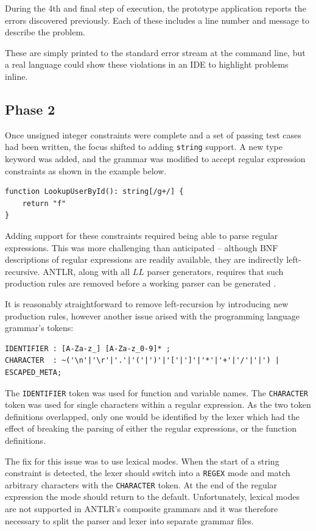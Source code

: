 \documentclass[a4paper]{article}
\begin{document}
    During the 4th and final step of execution, the prototype application reports the errors discovered previously. Each of these includes a line number and message to describe the problem.
    
    These are simply printed to the standard error stream at the command line, but a real language could show these violations in an IDE to highlight problems inline.

\subsection*{Phase 2}\hfill

Once unsigned integer constraints were complete and a set of passing test cases had been written, the focus shifted to adding \texttt{string} support. A new type keyword was added, and the grammar was modified to accept regular expression constraints as shown in the example below.

\begin{verbatim}
function LookupUserById(): string[/g+/] {
    return "f"
}
\end{verbatim}

Adding support for these constraints required being able to parse regular expressions. This was more challenging than anticipated -- although BNF descriptions of regular expressions are readily available, they are indirectly left-recursive. ANTLR, along with all $LL$ parser generators, requires that such production rules are removed before a working parser can be generated \citep{dick1990parsing}.

It is reasonably straightforward to remove left-recursion by introducing new production rules, however another issue arised with the programming language grammar's tokens:

\begin{verbatim}
IDENTIFIER : [A-Za-z_] [A-Za-z_0-9]* ;
CHARACTER  : ~('\n'|'\r'|'.'|'('|')'|'['|']'|'*'|'+'|'/'|'|') | ESCAPED_META;
\end{verbatim}

The \texttt{IDENTIFIER} token was used for function and variable names. The \texttt{CHARACTER} token was used for single characters within a regular expression. As the two token definitions overlapped, only one would be identified by the lexer which had the effect of breaking the parsing of either the regular expressions, or the function definitions.

The fix for this issue was to use lexical modes. When the start of a string constraint is detected, the lexer should switch into a \texttt{REGEX} mode and match arbitrary characters with the \texttt{CHARACTER} token. At the end of the regular expression the mode should return to the default. Unfortunately, lexical modes are not supported in ANTLR's composite grammars and it was therefore necessary to split the parser and lexer into separate grammar files.
\end{document}

